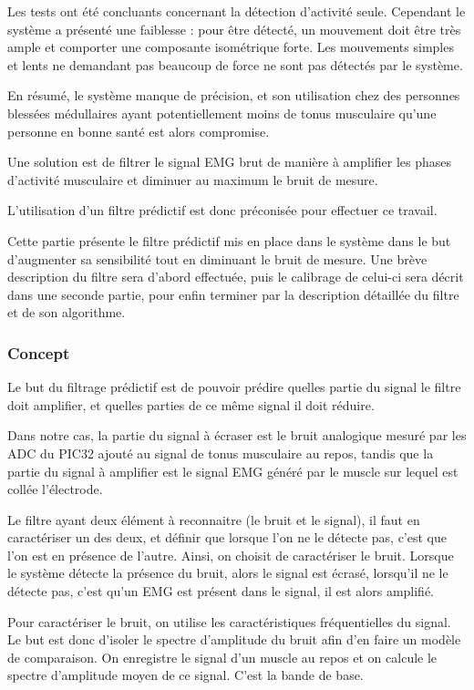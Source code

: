 \documentclass[letterpaper, twoside, 12pt, memoire, creativecommons, hyperref]{thETS}
\begin{document}
Les tests ont été concluants concernant la détection d'activité seule. Cependant le système a présenté une faiblesse : pour être détecté, un mouvement doit être très ample et comporter une composante isométrique forte. Les mouvements simples et lents ne demandant pas beaucoup de force ne sont pas détectés par le système. 

En résumé, le système manque de précision, et son utilisation chez des personnes blessées médullaires ayant potentiellement moins de tonus musculaire qu'une personne en bonne santé est alors compromise. 

Une solution est de filtrer le signal EMG brut de manière à amplifier les phases d'activité musculaire et diminuer au maximum le bruit de mesure. 

L'utilisation d'un filtre prédictif est donc préconisée pour effectuer ce travail. 

Cette partie présente le filtre prédictif mis en place dans le système dans le but d'augmenter sa sensibilité tout en diminuant le bruit de mesure. Une brève description du filtre sera d'abord effectuée, puis le calibrage de celui-ci sera décrit dans une seconde partie, pour enfin terminer par la description détaillée du filtre et de son algorithme.

\subsubsection{Concept}

Le but du filtrage prédictif est de pouvoir prédire quelles partie du signal le filtre doit amplifier, et quelles parties de ce même signal il doit réduire.

Dans notre cas, la partie du signal à écraser est le bruit analogique mesuré par les ADC du PIC32 ajouté au signal de tonus musculaire au repos, tandis que la partie du signal à amplifier est le signal EMG généré par le muscle sur lequel est collée l'électrode.

Le filtre ayant deux élément à reconnaitre (le bruit et le signal), il faut en caractériser un des deux, et définir que lorsque l'on ne le détecte pas, c'est que l'on est en présence de l'autre. Ainsi, on choisit de caractériser le bruit. Lorsque le système détecte la présence du bruit, alors le signal est écrasé, lorsqu'il ne le détecte pas, c'est qu'un EMG est présent dans le signal, il est alors amplifié.

Pour caractériser le bruit, on utilise les caractéristiques fréquentielles du signal. Le but est donc d'isoler le spectre d'amplitude du bruit afin d'en faire un modèle de comparaison. On enregistre le signal d'un muscle au repos et on calcule le spectre d'amplitude moyen de ce signal. C'est la bande de base.
\end{document}
